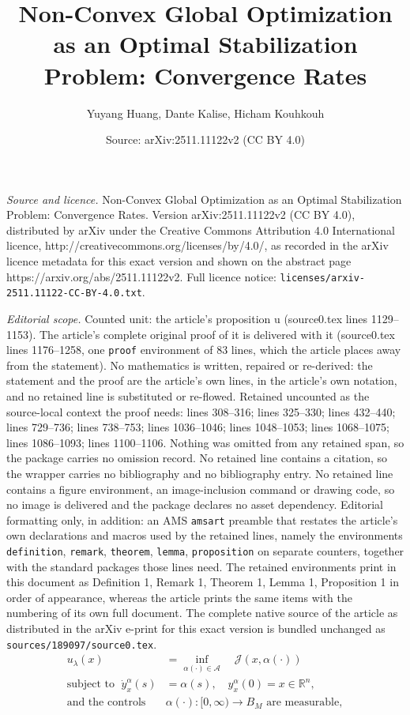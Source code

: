 \documentclass[10pt,a4paper]{amsart}
\title{Non-Convex Global Optimization as an Optimal Stabilization Problem: Convergence Rates}
\author{Yuyang Huang, Dante Kalise, Hicham Kouhkouh}
\date{Source: arXiv:2511.11122v2 (CC BY 4.0)}
\begin{document}
\maketitle

\noindent\emph{Source and licence.} Non-Convex Global Optimization as an Optimal Stabilization Problem: Convergence Rates. Version arXiv:2511.11122v2 (CC BY 4.0), distributed by arXiv under the Creative Commons Attribution 4.0 International licence, http://creativecommons.org/licenses/by/4.0/, as recorded in the arXiv licence metadata for this exact version and shown on the abstract page https://arxiv.org/abs/2511.11122v2. Full licence notice: \texttt{licenses/arxiv-2511.11122-CC-BY-4.0.txt}.\par\smallskip

\noindent\textit{Editorial scope.} Counted unit: the article's proposition u (source0.tex lines 1129--1153). The article's complete original proof of it is delivered with it (source0.tex lines 1176--1258, one \texttt{proof} environment of 83 lines, which the article places away from the statement). No mathematics is written, repaired or re-derived: the statement and the proof are the article's own lines, in the article's own notation, and no retained line is substituted or re-flowed.  Retained uncounted as the source-local context the proof needs: lines 308--316; lines 325--330; lines 432--440; lines 729--736; lines 738--753; lines 1036--1046; lines 1048--1053; lines 1068--1075; lines 1086--1093; lines 1100--1106.  Nothing was omitted from any retained span, so the package carries no omission record.  No retained line contains a citation, so the wrapper carries no bibliography and no bibliography entry.  No retained line contains a figure environment, an image-inclusion command or drawing code, so no image is delivered and the package declares no asset dependency.  Editorial formatting only, in addition: an AMS \texttt{amsart} preamble that restates the article's own declarations and macros used by the retained lines, namely the environments \texttt{definition}, \texttt{remark}, \texttt{theorem}, \texttt{lemma}, \texttt{proposition} on separate counters, together with the standard packages those lines need.  The retained environments print in this document as Definition 1, Remark 1, Theorem 1, Lemma 1, Proposition 1 in order of appearance, whereas the article prints the same items with the numbering of its own full document.  The complete native source of the article as distributed in the arXiv e-print for this exact version is bundled unchanged as \texttt{sources/189097/source0.tex}.
\begin{equation}\label{OCP}
\begin{aligned}
     u_{\lambda}(x) & = 
    \inf\limits_{\alpha(\cdot)\in \mathcal{A}} 
    \quad \mathscr{J}(x,\alpha(\cdot))\\
     \text{subject  to  }\; \dot{y}_{x}^{\alpha}(s) & = \alpha(s),\quad y_{x}^{\alpha}(0)=x\in\mathbb{R}^n,\\
     \text{and the controls } &\alpha(\cdot):[0,\infty) \to B_{M} \text{ are measurable},
\end{aligned}
\end{equation}
\end{document}
